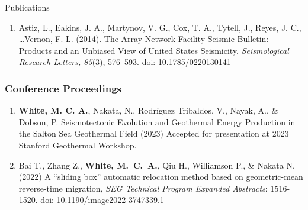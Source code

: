 \begin{rSection}{Publications}
\begin{enumerate}
		\item Astiz, L., Eakins, J. A., Martynov, V. G., Cox, T. A., Tytell, J., Reyes, J. C., \dots Vernon, F. L. (2014). The Array Network Facility Seismic Bulletin: Products and an Unbiased View of United States Seismicity. \textit{Seismological Research Letters, 85}(3), 576–593. doi: 10.1785/0220130141
	\end{enumerate}
	\subsubsection*{Conference Proceedings}
		\begin{enumerate}
			\item \textbf{White, M. C. A.}, Nakata, N., Rodríguez Tribaldos, V., Nayak, A., \& Dobson, P. Seismotectonic Evolution and Geothermal Energy Production in the Salton Sea Geothermal Field (2023) Accepted for presentation at 2023 Stanford Geothermal Workshop.
		
			\item Bai T., Zhang Z., \textbf{White, M.~C.~A.}, Qiu H., Williamson P., \& Nakata N. (2022) A ``sliding box'' automatic relocation method based on geometric-mean reverse-time migration, \textit{SEG Technical Program Expanded Abstracts}: 1516-1520.
			doi: 10.1190/image2022-3747339.1
		\end{enumerate}
\end{rSection}